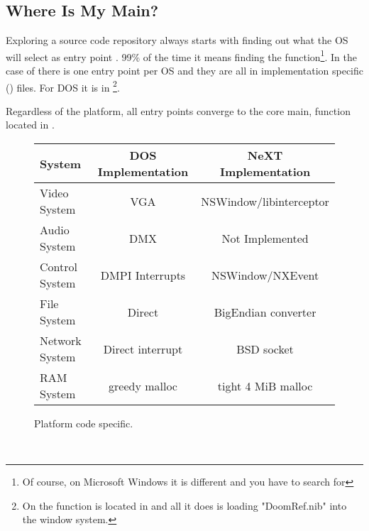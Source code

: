 \subsection{Where Is My Main?}
Exploring a source code repository always starts with finding out what the OS will select as entry point . 99\% of the time it means finding the  function\footnote{Of course, on Microsoft Windows it is different and you have to search for }. In the case of \doom{} there is one entry point per OS and they are all in implementation specific () files. For DOS it is in \footnote{On \NeXT the  function is located in  and all it does is loading "DoomRef.nib" into the window system.}.\\
\par
Regardless of the platform, all entry points converge to the core main, function  located in .\\ 
\par

 \begin{figure}[H]
\centering  
\begin{tabularx}{\textwidth}{ L{0.22} | C{0.39} | C{0.39} }
  \toprule
  \textbf{System} & \textbf{DOS Implementation} & \textbf{NeXT Implementation}\\
  \toprule 
    Video System & VGA & NSWindow/libinterceptor\\
    Audio System & DMX & Not Implemented\\
    Control System & DMPI Interrupts & NSWindow/NXEvent \\
    File  System & Direct & BigEndian converter\\
    Network System & Direct interrupt & BSD socket \\
    RAM System & greedy malloc & tight 4 MiB malloc\\
   \toprule
\end{tabularx}
\caption{Platform code specific.}
\end{figure}

\par

\\


\par



